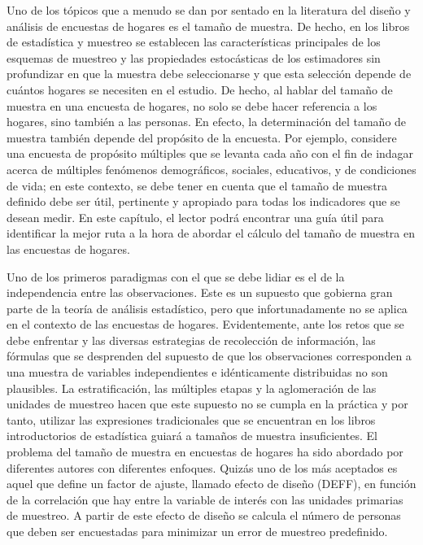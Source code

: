 Uno de los tópicos que a menudo se dan por sentado en la literatura del diseño y análisis de encuestas de hogares es el tamaño de muestra. De hecho, en los libros de estadística y muestreo se establecen las características principales de los esquemas de muestreo y las propiedades estocásticas de los estimadores sin profundizar en que la muestra debe seleccionarse y que esta selección depende de cuántos hogares se necesiten en el estudio. De hecho, al hablar del tamaño de muestra en una encuesta de hogares, no solo se debe hacer referencia a los hogares, sino también a las personas. En efecto, la determinación del tamaño de muestra también depende del propósito de la encuesta. Por ejemplo, considere una encuesta de propósito múltiples que se levanta cada año con el fin de indagar acerca de múltiples fenómenos demográficos, sociales, educativos, y de condiciones de vida; en este contexto, se debe tener en cuenta que el tamaño de muestra definido debe ser útil, pertinente y apropiado para todas los indicadores que se desean medir. En este capítulo, el lector podrá encontrar una guía útil para identificar la mejor ruta a la hora de abordar el cálculo del tamaño de muestra en las encuestas de hogares.

Uno de los primeros paradigmas con el que se debe lidiar es el de la independencia entre las observaciones. Este es un supuesto que gobierna gran parte de la teoría de análisis estadístico, pero que infortunadamente no se aplica en el contexto de las encuestas de hogares. Evidentemente, ante los retos que se debe enfrentar y las diversas estrategias de recolección de información, las fórmulas que se desprenden del supuesto de que los observaciones corresponden a una muestra de variables independientes e idénticamente distribuidas no son plausibles. La estratificación, las múltiples etapas y la aglomeración de las unidades de muestreo hacen que este supuesto no se cumpla en la práctica y por tanto, utilizar las expresiones tradicionales que se encuentran en los libros introductorios de estadística guiará a tamaños de muestra insuficientes. El problema del tamaño de muestra en encuestas de hogares ha sido abordado por diferentes autores con diferentes enfoques. Quizás uno de los más aceptados es aquel que define un factor de ajuste, llamado efecto de diseño (DEFF), en función de la correlación que hay entre la variable de interés con las unidades primarias de muestreo. A partir de este efecto de diseño se calcula el número de personas que deben ser encuestadas para minimizar un error de muestreo predefinido.

